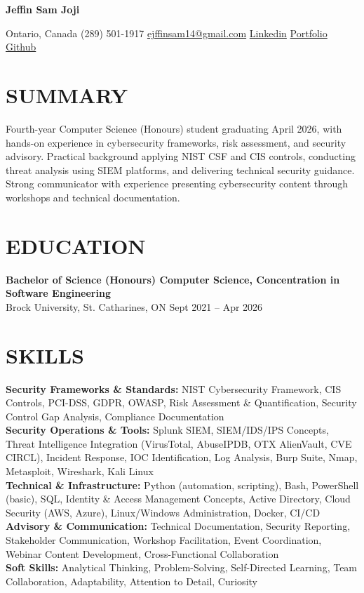 \documentclass[11pt]{article}
\begin{document}
\begin{center}
    {\Huge \textbf{Jeffin Sam Joji}}

 Ontario, Canada \textbar{} (289) 501-1917 \textbar{} \href{mailto:ejffinsam14@gmail.com}{ejffinsam14@gmail.com} \textbar{} \href{https://linkedin.com/in/jeffin-sam-joji}{Linkedin} \textbar{} \href{https://jeff13in.github.io/Portfolio/}{Portfolio} \textbar{} \href{https://github.com/jeff13in}{Github}
\end{center}

\section*{SUMMARY}
Fourth-year Computer Science (Honours) student graduating April 2026, with hands-on experience in cybersecurity frameworks, risk assessment, and security advisory. Practical background applying NIST CSF and CIS controls, conducting threat analysis using SIEM platforms, and delivering technical security guidance. Strong communicator with experience presenting cybersecurity content through workshops and technical documentation.

\section*{EDUCATION}

\textbf{Bachelor of Science (Honours) Computer Science, Concentration in Software Engineering} \\
Brock University, St. Catharines, ON \hfill Sept 2021 -- Apr 2026

\section*{SKILLS}
\textbf{Security Frameworks \& Standards:} NIST Cybersecurity Framework, CIS Controls, PCI-DSS, GDPR, OWASP, Risk Assessment \& Quantification, Security Control Gap Analysis, Compliance Documentation\\
\textbf{Security Operations \& Tools:} Splunk SIEM, SIEM/IDS/IPS Concepts, Threat Intelligence Integration (VirusTotal, AbuseIPDB, OTX AlienVault, CVE CIRCL), Incident Response, IOC Identification, Log Analysis, Burp Suite, Nmap, Metasploit, Wireshark, Kali Linux\\
\textbf{Technical \& Infrastructure:} Python (automation, scripting), Bash, PowerShell (basic), SQL, Identity \& Access Management Concepts, Active Directory, Cloud Security (AWS, Azure), Linux/Windows Administration, Docker, CI/CD\\
\textbf{Advisory \& Communication:} Technical Documentation, Security Reporting, Stakeholder Communication, Workshop Facilitation, Event Coordination, Webinar Content Development, Cross-Functional Collaboration\\
\textbf{Soft Skills:} Analytical Thinking, Problem-Solving, Self-Directed Learning, Team Collaboration, Adaptability, Attention to Detail, Curiosity
\end{document}

